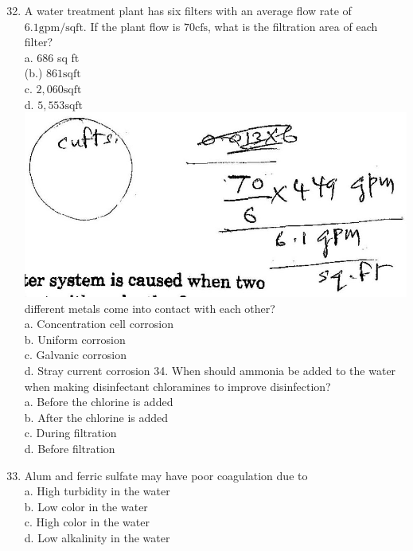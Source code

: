 \documentclass[10pt]{article}
\begin{document}
\begin{enumerate}
  \setcounter{enumi}{31}
  \item A water treatment plant has six filters with an average flow rate of $6.1 \mathrm{gpm} / \mathrm{sq} \mathrm{ft}$. If the plant flow is $70 \mathrm{cfs}$, what is the filtration area of each filter?\\
a. 686 sq ft\\
(b.) $861 \mathrm{sq} \mathrm{ft}$\\
c. $2,060 \mathrm{sq} \mathrm{ft}$\\
d. $5,553 \mathrm{sq} \mathrm{ft}$\\

\includegraphics[max width=\textwidth]{2022_11_11_ca6a6c1a0324ee23e523g-56}\\
different metals come into contact with each other?\\
a. Concentration cell corrosion\\
b. Uniform corrosion\\
c. Galvanic corrosion\\
d. Stray current corrosion 34. When should ammonia be added to the water when making disinfectant chloramines to improve disinfection?\\
a. Before the chlorine is added\\
b. After the chlorine is added\\
c. During filtration\\
d. Before filtration

  \item Alum and ferric sulfate may have poor coagulation due to\\
a. High turbidity in the water\\
b. Low color in the water\\
c. High color in the water\\
d. Low alkalinity in the water


\end{enumerate}
\end{document}
